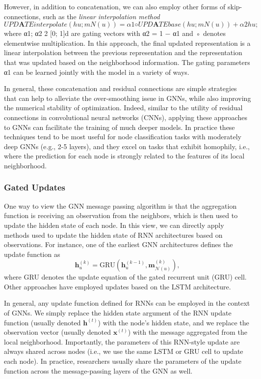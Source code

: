 \documentclass[10pt]{book}
\let\defaultmarginpar\marginpar
\renewcommand\marginpar[2][]{\defaultmarginpar{\itshape\color{gray}#2}}
\begin{document}
However, in addition to concatenation, we can also employ other forms of skip-connections, such as the \emph{linear interpolation method}\marginpar{linear interpolation method}
\begin{equation}
    UPD\mathbf ATEinterpolate(hu; mN(u)) = α1 ◦ UPD\mathbf ATEbase(hu; mN(u)) + α2 hu;
\end{equation}
where α1; α2 2 [0; 1]d are gating vectors with α2 = 1 − α1 and ◦ denotes elementwise multiplication. In this approach, the final updated representation is a linear interpolation between the previous representation and the representation that was updated based on the neighborhood information. The gating parameters α1 can be learned jointly with the model in a variety of ways.

In general, these concatenation and residual connections are simple strategies that can help to alleviate the over-smoothing issue in GNNs, while also improving the numerical stability of optimization. Indeed, similar to the utility of residual connections in convolutional neural networks (CNNs), applying these approaches to GNNs can facilitate the training of much deeper models. In practice these techniques tend to be most useful for node classification tasks with moderately deep GNNs (e.g., 2-5 layers), and they excel on tasks that exhibit homophily, i.e., where the prediction for each node is
strongly related to the features of its local neighborhood.

\subsubsection{Gated Updates}

One way to view the GNN message passing algorithm is that the aggregation function is receiving an observation from the neighbors, which is then used to update the hidden state of each node. In this view, we can directly apply methods used to update the hidden state of RNN architectures based on observations. For instance, one of the earliest GNN architectures defines the update function as
\begin{equation}
    \mathbf h^{(k)}_u = \text{GRU}(\mathbf h_u^{(k-1)}, \mathbf m^{(k)}_{\mathcal N(u)}),
\end{equation}
where GRU denotes the update equation of the gated recurrent unit (GRU) cell. Other approaches have employed updates based on the
LSTM architecture.

In general, any update function defined for RNNs can be employed in the context of GNNs. We simply replace the hidden state argument of the RNN update function (usually denoted $\mathbf h^{(t)}$) with the node's hidden state, and we replace the observation vector (usually denoted $\mathbf x^{(t)}$) with the message aggregated from the local neighborhood. Importantly, the parameters of this RNN-style update are always shared across nodes (i.e., we use the same LSTM or GRU cell to update each node). In practice, researchers usually share the parameters of the update function across the message-passing layers of the GNN as well.
\end{document}
